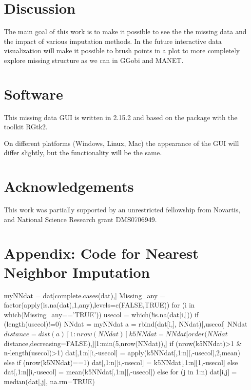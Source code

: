 \documentclass[article]{jss}
\begin{document}
\section{Discussion}

The main goal of this work is to make it possible to see the the missing data and the impact of various imputation methods. In the future interactive data visualization will make it possible to brush points in a plot to more completely explore missing structure as we can in GGobi and MANET.


\section*{Software}

This missing data GUI is written in  2.15.2 \citep{r} and based on the package  \citep{gwidgets} with the toolkit RGtk2. 

On different platforms (Windows, Linux, Mac) the appearance of the GUI will differ slightly, but the functionality will be the same.

\section*{Acknowledgements}

This work was partially supported by an unrestricted fellowship from Novartis, and National Science Research grant DMS0706949.




\section*{Appendix: Code for Nearest Neighbor Imputation}

\begin{Code}
myNNdat = dat[complete.cases(dat),]
Missing_any = factor(apply(is.na(dat),1,any),levels=c(FALSE,TRUE))
for (i in which(Missing_any=='TRUE')){
    usecol = which(!is.na(dat[i,]))
    if (length(usecol)!=0){
        NNdat = myNNdat
        a = rbind(dat[i,], NNdat)[,usecol]
        NNdat$distance = dist(a)[1:nrow(NNdat)]
        k5NNdat = NNdat[order(NNdat$distance,decreasing=FALSE),][1:min(5,nrow(NNdat)),]
        if (nrow(k5NNdat)>1 & n-length(usecol)>1) {
            dat[,1:n][i,-usecol] = apply(k5NNdat[,1:n][,-usecol],2,mean)
        } else {
            if (nrow(k5NNdat)==1) {
                dat[,1:n][i,-usecol] = k5NNdat[,1:n][1,-usecol]
            } else {
                dat[,1:n][i,-usecol] = mean(k5NNdat[,1:n][,-usecol])
            }
        }
    } else {
        for (j in 1:n) {
            dat[i,j] = median(dat[,j], na.rm=TRUE)
        }
    }
}
\end{Code}
\end{document}
